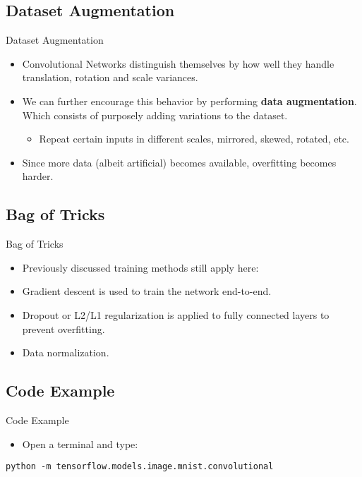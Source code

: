 \subsection{Dataset Augmentation}
\begin{frame}{Dataset Augmentation}
	\begin{itemize}
		\item Convolutional Networks distinguish themselves by how well they handle translation, rotation and scale variances.
		\item We can further encourage this behavior by performing \textbf{data augmentation}. Which consists of purposely adding variations to the dataset.
		      \begin{itemize}
		      	\item Repeat certain inputs in different scales, mirrored, skewed, rotated, etc.
		      \end{itemize}
		\item Since more data (albeit artificial) becomes available, overfitting becomes harder.
	\end{itemize}
\end{frame}

\subsection{Bag of Tricks}
\begin{frame}{Bag of Tricks}
	\begin{itemize}
		\item Previously discussed training methods still apply here:
		\item Gradient descent is used to train the network end-to-end.
		\item Dropout or L2/L1 regularization is applied to fully connected layers to prevent overfitting.
		\item Data normalization.
	\end{itemize}
\end{frame}

\subsection{Code Example}
\begin{frame}{Code Example}
	\begin{itemize}
		\item Open a terminal and type:
	\end{itemize}
	\begin{center}
		{\smaller \texttt{python -m tensorflow.models.image.mnist.convolutional}}
	\end{center}
\end{frame}

